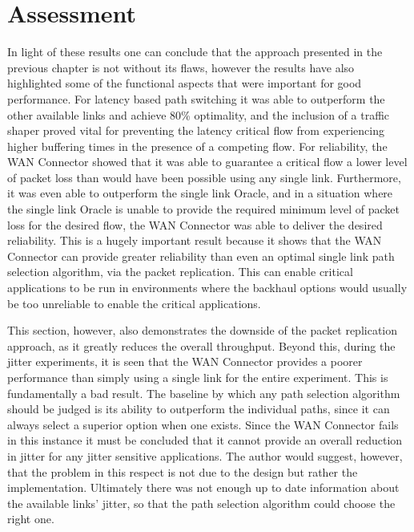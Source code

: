 \section{Assessment}

In light of these results one can conclude that the approach presented in the previous chapter is not without its flaws, however the results have also highlighted some of the functional aspects that were important for good performance. For latency based path switching it was able to outperform the other available links and achieve 80\% optimality, and the inclusion of a traffic shaper proved vital for preventing the latency critical flow from experiencing higher buffering times in the presence of a competing flow. For reliability, the WAN Connector showed that it was able to guarantee a critical flow a lower level of packet loss than would have been possible using any single link. Furthermore, it was even able to outperform the single link Oracle, and in a situation where the single link Oracle is unable to provide the required minimum level of packet loss for the desired flow, the WAN Connector was able to deliver the desired reliability. This is a hugely important result because it shows that the WAN Connector can provide greater reliability than even an optimal single link path selection algorithm, via the packet replication. This can enable critical applications to be run in environments where the backhaul options would usually be too unreliable to enable the critical applications.

This section, however, also demonstrates the downside of the packet replication approach, as it greatly reduces the overall throughput. Beyond this, during the jitter experiments, it is seen that the WAN Connector provides a poorer performance than simply using a single link for the entire experiment. This is fundamentally a bad result. The baseline by which any path selection algorithm should be judged is its ability to outperform the individual paths, since it can always select a superior option when one exists. Since the WAN Connector fails in this instance it must be concluded that it cannot provide an overall reduction in jitter for any jitter sensitive applications. The author would suggest, however, that the problem in this respect is not due to the design but rather the implementation. Ultimately there was not enough up to date information about the available links' jitter, so that the path selection algorithm could choose the right one.












